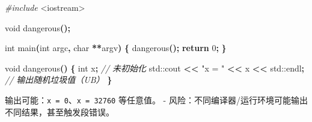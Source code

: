 \documentclass[
  10pt,
  a4paper,
  UTF8,twoside]{book}
\newenvironment{Shaded}{\begin{snugshade}}{\end{snugshade}}
\newcommand{\BuiltInTok}[1]{#1}
\newcommand{\CommentTok}[1]{\textcolor[rgb]{0.56,0.35,0.01}{\textit{#1}}}
\newcommand{\ControlFlowTok}[1]{\textcolor[rgb]{0.13,0.29,0.53}{\textbf{#1}}}
\newcommand{\DataTypeTok}[1]{\textcolor[rgb]{0.13,0.29,0.53}{#1}}
\newcommand{\DecValTok}[1]{\textcolor[rgb]{0.00,0.00,0.81}{#1}}
\newcommand{\ImportTok}[1]{#1}
\newcommand{\NormalTok}[1]{#1}
\newcommand{\OperatorTok}[1]{\textcolor[rgb]{0.81,0.36,0.00}{\textbf{#1}}}
\newcommand{\PreprocessorTok}[1]{\textcolor[rgb]{0.56,0.35,0.01}{\textit{#1}}}
\newcommand{\StringTok}[1]{\textcolor[rgb]{0.31,0.60,0.02}{#1}}
\begin{document}
\begin{Shaded}
\begin{Highlighting}[]
\PreprocessorTok{\#include }\ImportTok{\textless{}iostream\textgreater{}}

\DataTypeTok{void}\NormalTok{ dangerous}\OperatorTok{();}

\DataTypeTok{int}\NormalTok{ main}\OperatorTok{(}\DataTypeTok{int}\NormalTok{ argc}\OperatorTok{,} \DataTypeTok{char} \OperatorTok{**}\NormalTok{argv}\OperatorTok{)} \OperatorTok{\{}
\NormalTok{  dangerous}\OperatorTok{();}
  \ControlFlowTok{return} \DecValTok{0}\OperatorTok{;}
\OperatorTok{\}}

\DataTypeTok{void}\NormalTok{ dangerous}\OperatorTok{()} \OperatorTok{\{}
  \DataTypeTok{int}\NormalTok{ x}\OperatorTok{;}                                 \CommentTok{// 未初始化}
  \BuiltInTok{std::}\NormalTok{cout }\OperatorTok{\textless{}\textless{}} \StringTok{"x = "} \OperatorTok{\textless{}\textless{}}\NormalTok{ x }\OperatorTok{\textless{}\textless{}} \BuiltInTok{std::}\NormalTok{endl}\OperatorTok{;} \CommentTok{// 输出随机垃圾值（UB）}
\OperatorTok{\}}
\end{Highlighting}
\end{Shaded}

输出可能：\texttt{x\ =\ 0}、\texttt{x\ =\ 32760} 等任意值。 - 风险：不同编译器/运行环境可能输出不同结果，甚至触发段错误。
\end{document}
